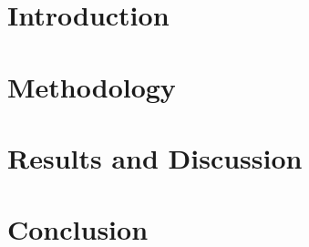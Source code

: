 \documentclass[aspectratio=169]{beamer} %
\begin{document}
{{\begin{frame}
\begin{flushright}
\begin{columns}
\begin{itemize}
         \end{itemize}
    \end{columns}

\end{flushright}


\end{frame} }



\section{Introduction}
\section{Methodology}
\section{Results and Discussion}
\section{Conclusion}






\begin{frame}[allowframebreaks]
	\vspace{1cm}
	\color{blue}{References}
\beamertemplatetextbibitems
\tiny


\end{frame}
}
\makeatother
\end{document}
